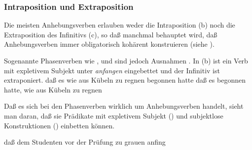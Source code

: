 \subsubsection{Intraposition und Extraposition}
\label{sec-subj-rais-ie}

Die meisten Anhebungsverben erlauben weder die Intraposition (b) noch
die Extraposition des Infinitivs (c), so daß manchmal behauptet wird, daß Anhebungsverben
immer obligatorisch kohärent konstruieren (siehe \zb {}).
\eal
\label{bsp-intra-extra-scheinen}
\zl

\noindent
Sogenannte Phasenverben wie ,  und 
 sind jedoch Ausnahmen \citep[]{Kiss95a}. 
In (b) ist ein Verb mit expletivem Subjekt unter \emph{anfangen} eingebettet
und der Infinitiv ist extraponiert.
\eal
\ex
daß    es   wie aus Kübeln zu regnen begonnen hatte
\ex 
daß    es  begonnen hatte, wie aus Kübeln zu regnen
\zl

\noindent
Daß es sich bei den Phasenverben wirklich um Anhebungsverben handelt, sieht
man daran, daß sie Prädikate mit expletivem Subjekt () und subjektlose Konstruktionen ()
einbetten können.

\ea
daß dem Studenten vor der Prüfung zu grauen anfing
\z

